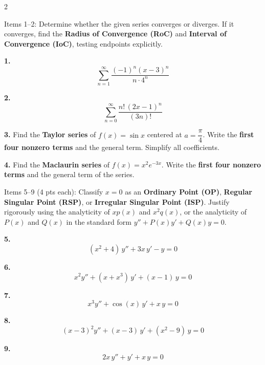 \documentclass[a4paper,10pt]{article}
\begin{document}
\vspace{4pt}
\begin{multicols}{2}

    \noindent Items 1--2: Determine whether the given series converges or diverges. If it converges, find the \textbf{Radius of Convergence (RoC)} and \textbf{Interval of Convergence (IoC)}, testing endpoints explicitly.

    \medskip
    \noindent\textbf{1.}
    \[
        \sum_{n=1}^{\infty} \frac{(-1)^{n}(x-3)^{n}}{n\cdot 4^{n}}
    \]

    \medskip
    \noindent\textbf{2.}
    \[
        \sum_{n=0}^{\infty} \frac{n!\,(2x-1)^{n}}{(3n)!}
    \]

    \medskip

    \textbf{3.} Find the \textbf{Taylor series} of $f(x)=\sin x$ centered at $a=\dfrac{\pi}{4}$. Write the \textbf{first four nonzero terms} and the general term. Simplify all coefficients.

    \medskip

    \textbf{4.} Find the \textbf{Maclaurin series} of $f(x)=x^{2}e^{-3x}$. Write the \textbf{first four nonzero terms} and the general term of the series.

    \vspace{3pt}
    \noindent Items 5--9 (4 pts each): Classify $x=0$ as an \textbf{Ordinary Point (OP)}, \textbf{Regular Singular Point (RSP)}, or \textbf{Irregular Singular Point (ISP)}. Justify rigorously using the analyticity of $xp(x)$ and $x^{2}q(x)$, or the analyticity of $P(x)$ and $Q(x)$ in the standard form $y''+P(x)y'+Q(x)y=0$.

    \medskip
    \noindent\textbf{5.}
    \[
        (x^{2}+4)\,y'' + 3x\,y' - y = 0
    \]

    \medskip
    \noindent\textbf{6.}
    \[
        x^{2}y'' + (x+x^{3})\,y' + (x-1)\,y = 0
    \]

    \medskip
    \noindent\textbf{7.}
    \[
        x^{3}y'' + \cos(x)\,y' + x\,y = 0
    \]

    \medskip
    \noindent\textbf{8.}
    \[
        (x-3)^{2}y'' + (x-3)\,y' + (x^{2}-9)\,y = 0
    \]

    \medskip
    \noindent\textbf{9.}
    \[
        2x\,y'' + y' + x\,y = 0
    \]


\end{multicols}
\end{document}
